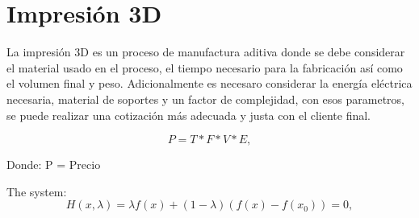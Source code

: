 \documentclass[conference]{IEEEtran}
\begin{document}
\section{Impresión 3D}

La impresión 3D es un proceso de manufactura aditiva donde se debe considerar el material usado en el proceso, el tiempo necesario para la fabricación así como el volumen final y peso. Adicionalmente es necesaro considerar la energía eléctrica necesaria, material de soportes y un factor de complejidad, con esos parametros, se puede realizar una cotización más adecuada y justa con el cliente final.

\begin{equation}
\label{ohm}
P=T*F*V*E,
\end{equation}

Donde:
P = Precio

The system:  
 \begin{equation}
    \label{Homotopia_G}
     H(x,\lambda)= \lambda f(x)+ (1-\lambda)(f(x)- f(x_0))=0,
 \end{equation}
 
\end{document}
